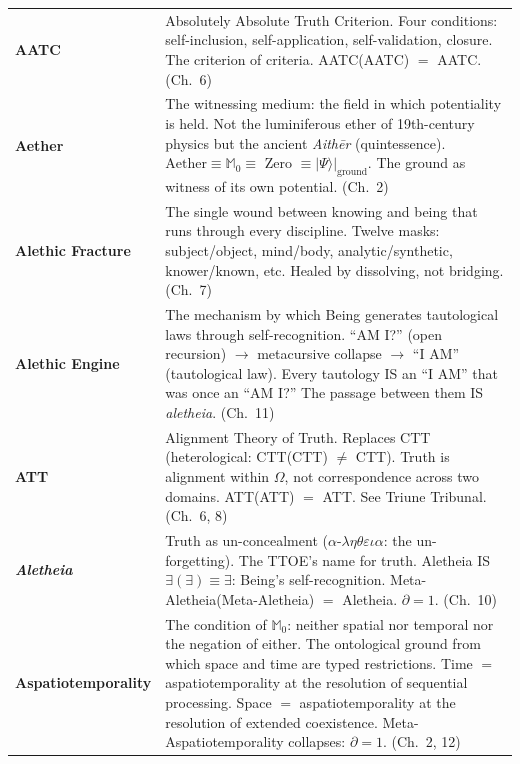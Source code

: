 \documentclass[10pt, openany, oneside]{book}
\renewcommand{\footnotesize}{\fontsize{8.5}{11}\selectfont}
\begin{document}
{\footnotesize
\noindent\begin{tabular}{@{} l @{\hspace{0.6em}} p{} @{}}
\textbf{AATC} & Absolutely Absolute Truth Criterion. Four conditions: self-inclusion, self-application, self-validation, closure. The criterion of criteria. AATC(AATC) $=$ AATC. (Ch.\ 6) \\[0.3em]
\textbf{Aether} & The witnessing medium: the field in which potentiality is held. Not the luminiferous ether of 19th-century physics but the ancient \textit{Aith\={e}r} (quintessence). $\text{Aether} \equiv \mathbb{M}_0 \equiv$ Zero $\equiv |\Psi\rangle|_{\text{ground}}$. The ground as witness of its own potential. (Ch.\ 2) \\[0.3em]
\textbf{Alethic Fracture} & The single wound between knowing and being that runs through every discipline. Twelve masks: subject/object, mind/body, analytic/synthetic, knower/known, etc. Healed by dissolving, not bridging. (Ch.\ 7) \\[0.3em]
\textbf{Alethic Engine} & The mechanism by which Being generates tautological laws through self-recognition. ``AM I?'' (open recursion) $\to$ metacursive collapse $\to$ ``I AM'' (tautological law). Every tautology IS an ``I AM'' that was once an ``AM I?'' The passage between them IS \textit{aletheia}. (Ch.\ 11) \\[0.3em]
\textbf{ATT} & Alignment Theory of Truth. Replaces CTT (heterological: CTT(CTT) $\neq$ CTT). Truth is alignment within $\Omega$, not correspondence across two domains. ATT(ATT) $=$ ATT. See Triune Tribunal. (Ch.\ 6, 8) \\[0.3em]
\textbf{\textit{Aletheia}} & Truth as un-concealment ($\alpha$-$\lambda\eta\theta\varepsilon\iota\alpha$: the un-forgetting). The TTOE's name for truth. Aletheia IS $\exists(\exists) \equiv \exists$: Being's self-recognition. Meta-Aletheia(Meta-Aletheia) $=$ Aletheia. $\partial = 1$. (Ch.\ 10) \\[0.3em]
\textbf{Aspatiotemporality} & The condition of $\mathbb{M}_0$: neither spatial nor temporal nor the negation of either. The ontological ground from which space and time are typed restrictions. Time $=$ aspatiotemporality at the resolution of sequential processing. Space $=$ aspatiotemporality at the resolution of extended coexistence. Meta-Aspatiotemporality collapses: $\partial = 1$. (Ch.\ 2, 12) \\[0.3em]
\end{tabular}
}
\end{document}
